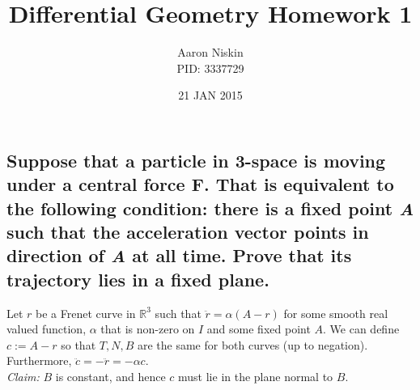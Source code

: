 \documentclass[12pt]{amsart}
\begin{document}
\title{Differential Geometry Homework 1}
\author{Aaron Niskin \\PID: 3337729}
\date{21 JAN 2015}
\maketitle

\section{}
\subsection{Suppose that a particle in 3-space is moving under a central force \textbf{F}. That is equivalent to the following condition: there is a fixed point \emph{A} such that the acceleration vector points in direction of \emph{A} at all time. Prove that its trajectory lies in a fixed plane.}
Let $r$ be a Frenet curve in $\mathbb{R}^3$ such that $\ddot r=\alpha\left(A-r\right)$ for some smooth real valued function, $\alpha$ that is non-zero on $I$ and some fixed point $A$. We can define $c:=A-r$ so that $T,N,B$ are the same for both curves (up to negation). Furthermore, $\ddot c=-\ddot r=-\alpha c$.
\\\textit{Claim:} $B$ is constant, and hence $c$ must lie in the plane normal to $B$.
\end{document}
